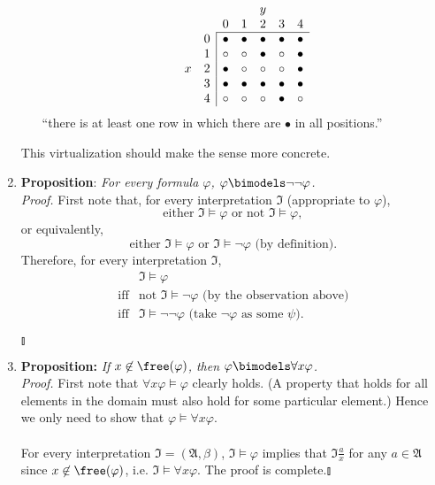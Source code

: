 \begin{enumerate}[1.]
\begin{enumerate}
\[
\begin{array}{cc|ccccc}
\multicolumn{4}{c}{\ } & y & \ & \ \cr
\multicolumn{2}{c}{\ } & 0 & 1 & 2 & 3 & 4 \cr\cline{3-7}
\ & 0 & \bullet & \bullet & \bullet & \bullet & \bullet \cr
\ & 1 & \circ & \circ & \bullet & \circ & \bullet \cr
x & 2 & \bullet & \circ & \circ & \circ & \bullet \cr
\ & 3 & \bullet & \bullet & \bullet & \bullet & \bullet \cr
\ & 4 & \circ & \circ & \circ & \bullet & \circ
\end{array}
\]
``there is at least one row in which there are $\bullet$ in all positions.''
\end{enumerate}
This virtualization should make the sense more concrete.
%
\item \textbf{Proposition}: \textit{For every formula $\varphi$, $\varphi \bimodels \neg \neg \varphi$.}\\
\textit{Proof.} First note that, for every interpretation $\mathfrak{I}$ (appropriate to $\varphi$),
\[
\mbox{either $\mathfrak{I} \models \varphi$ or not $\mathfrak{I} \models \varphi$},
\]
or equivalently,
\[
\mbox{either $\mathfrak{I} \models \varphi$ or $\mathfrak{I} \models \neg \varphi$ \ (by definition).}
\]
Therefore, for every interpretation $\mathfrak{I}$,
\[
\begin{array}{ll}
\,  & \mathfrak{I} \models \varphi \\
\mbox{iff} & \mbox{not $\mathfrak{I} \models \neg \varphi$ \ (by the observation above)} \\
\mbox{iff} & \mathfrak{I} \models \neg \neg \varphi \mbox{ \ (take $\neg \varphi$ as some $\psi$)}.
\end{array}
\]
\begin{flushright}$\talloblong$\end{flushright}
%
\item \textbf{Proposition:} \textit{If $x \not \in \free(\varphi)$, then $\varphi \bimodels \forall x \varphi$.}
\\
\textit{Proof.} First note that $\forall x \varphi \models \varphi$ clearly holds. (A property that holds for all elements in the domain must also hold for some particular element.) Hence we only need to show that $\varphi \models \forall x \varphi$.\\
\\
For every interpretation $\mathfrak{I} = (\mathfrak{A}, \beta)$, $\mathfrak{I} \models \varphi$ implies that $\mathfrak{I} \frac{a}{x}$ for any $a \in \mathfrak{A}$ since $x \not \in \free(\varphi)$, i.e. $\mathfrak{I} \models \forall x \varphi$. The proof is complete.\nolinebreak\hfill$\talloblong$

\end{enumerate}
